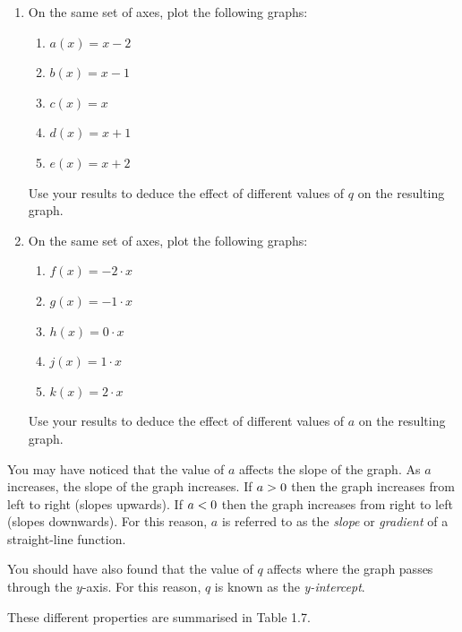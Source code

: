         \label{m39338*id237639}\begin{enumerate}[noitemsep, label=\textbf{\arabic*}. ] 
            \label{m39338*uid70}\item On the same set of axes, plot the following graphs:
\label{m39338*id237654}\begin{enumerate}[noitemsep, label=\textbf{\alph*}. ] 
            \label{m39338*uid71}\item $a\left(x\right)=x-2$\label{m39338*uid72}\item $b\left(x\right)=x-1$\label{m39338*uid73}\item $c\left(x\right)=x$\label{m39338*uid74}\item $d\left(x\right)=x+1$\label{m39338*uid75}\item $e\left(x\right)=x+2$\end{enumerate}
Use your results to deduce the effect of different values of $q$ on the resulting graph.
\label{m39338*uid76}\item On the same set of axes, plot the following graphs:
\label{m39338*id237854}\begin{enumerate}[noitemsep, label=\textbf{\alph*}. ] 
            \label{m39338*uid77}\item $f\left(x\right)=-2\ensuremath{\cdot}x$\label{m39338*uid78}\item $g\left(x\right)=-1\ensuremath{\cdot}x$\label{m39338*uid79}\item $h\left(x\right)=0\ensuremath{\cdot}x$\label{m39338*uid80}\item $j\left(x\right)=1\ensuremath{\cdot}x$\label{m39338*uid81}\item $k\left(x\right)=2\ensuremath{\cdot}x$\end{enumerate}
Use your results to deduce the effect of different values of $a$ on the resulting graph.
\end{enumerate}
        \label{m39338*id238062}You may have noticed that the value of $a$ affects the slope of the graph. As $a$ increases, the slope of the graph increases. If $a>{}0$ then the graph increases from left to right (slopes upwards). If $a<{}0$ then the graph increases from right to left (slopes downwards). For this reason, $a$ is referred to as the \textsl{slope} or \textsl{gradient} of a straight-line function.\par 
        \label{m39338*id238136}You should have also found that the value of $q$ affects where the graph passes through the $y$-axis. For this reason, $q$ is known as the \textsl{y-intercept}.\par 
        \label{m39338*id238175}These different properties are summarised in Table 1.7.\par 

